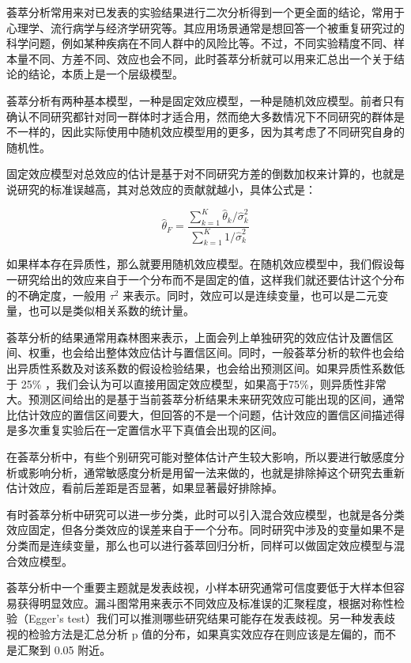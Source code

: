 \documentclass[]{tufte-book}
\begin{document}
荟萃分析常用来对已发表的实验结果进行二次分析得到一个更全面的结论，常用于心理学、流行病学与经济学研究等。其应用场景通常是想回答一个被重复研究过的科学问题，例如某种疾病在不同人群中的风险比等。不过，不同实验精度不同、样本量不同、方差不同、效应也会不同，此时荟萃分析就可以用来汇总出一个关于结论的结论，本质上是一个层级模型。

荟萃分析有两种基本模型，一种是固定效应模型，一种是随机效应模型。前者只有确认不同研究都针对同一群体时才适合用，然而绝大多数情况下不同研究的群体是不一样的，因此实际使用中随机效应模型用的更多，因为其考虑了不同研究自身的随机性。

固定效应模型对总效应的估计是基于对不同研究方差的倒数加权来计算的，也就是说研究的标准误越高，其对总效应的贡献就越小，具体公式是：

\[\hat\theta_F = \frac{\sum\limits_{k=1}^K \hat\theta_k/ \hat\sigma^2_k}{\sum\limits_{k=1}^K 1/\hat\sigma^2_k}\]

如果样本存在异质性，那么就要用随机效应模型。在随机效应模型中，我们假设每一研究给出的效应来自于一个分布而不是固定的值，这样我们就还要估计这个分布的不确定度，一般用 \(\tau^2\) 来表示。同时，效应可以是连续变量，也可以是二元变量，也可以是类似相关系数的统计量。

荟萃分析的结果通常用森林图来表示，上面会列上单独研究的效应估计及置信区间、权重，也会给出整体效应估计与置信区间。同时，一般荟萃分析的软件也会给出异质性系数及对该系数的假设检验结果，也会给出预测区间。如果异质性系数低于 25\% ，我们会认为可以直接用固定效应模型，如果高于75\%，则异质性非常大。预测区间给出的是基于当前荟萃分析结果未来研究效应可能出现的区间，通常比估计效应的置信区间要大，但回答的不是一个问题，估计效应的置信区间描述得是多次重复实验后在一定置信水平下真值会出现的区间。

在荟萃分析中，有些个别研究可能对整体估计产生较大影响，所以要进行敏感度分析或影响分析，通常敏感度分析是用留一法来做的，也就是排除掉这个研究去重新估计效应，看前后差距是否显著，如果显著最好排除掉。

有时荟萃分析中研究可以进一步分类，此时可以引入混合效应模型，也就是各分类效应固定，但各分类效应的误差来自于一个分布。同时研究中涉及的变量如果不是分类而是连续变量，那么也可以进行荟萃回归分析，同样可以做固定效应模型与混合效应模型。

荟萃分析中一个重要主题就是发表歧视，小样本研究通常可信度要低于大样本但容易获得明显效应。漏斗图常用来表示不同效应及标准误的汇聚程度，根据对称性检验（Egger's test）我们可以推测哪些研究结果可能存在发表歧视。另一种发表歧视的检验方法是汇总分析 p 值的分布，如果真实效应存在则应该是左偏的，而不是汇聚到 0.05 附近。
\end{document}
